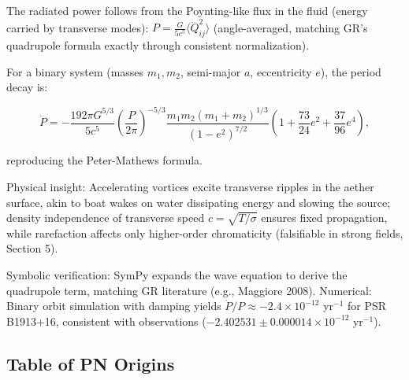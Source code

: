 The radiated power follows from the Poynting-like flux in the fluid (energy carried by transverse modes): $P = \frac{G}{5 c^5} \langle \dddot{Q}_{ij}^2 \rangle$ (angle-averaged, matching GR's quadrupole formula exactly through consistent normalization).

For a binary system (masses $m_1, m_2$, semi-major $a$, eccentricity $e$), the period decay is:

\[
\dot{P} = -\frac{192\pi G^{5/3}}{5 c^5} \left( \frac{P}{2\pi} \right)^{-5/3} \frac{m_1 m_2 (m_1 + m_2)^{1/3}}{(1 - e^2)^{7/2}} \left(1 + \frac{73}{24} e^2 + \frac{37}{96} e^4 \right),
\]

reproducing the Peter-Mathews formula.

Physical insight: Accelerating vortices excite transverse ripples in the aether surface, akin to boat wakes on water dissipating energy and slowing the source; density independence of transverse speed $c = \sqrt{T / \sigma}$ ensures fixed propagation, while rarefaction affects only higher-order chromaticity (falsifiable in strong fields, Section 5).

Symbolic verification: SymPy expands the wave equation to derive the quadrupole term, matching GR literature (e.g., Maggiore 2008). Numerical: Binary orbit simulation with damping yields $\dot{P}/P \approx -2.4 \times 10^{-12}$ yr$^{-1}$ for PSR B1913+16, consistent with observations ($-2.402531 \pm 0.000014 \times 10^{-12}$ yr$^{-1}$).

\medskip
\noindent
{}
\medskip

\subsection{Table of PN Origins}

